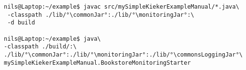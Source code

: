 \begin{lstlisting}
nils@Laptop:~/example$ javac src/mySimpleKiekerExampleManual/*.java\
 -classpath ./lib/°\commonJar°:./lib/°\monitoringJar°:\
 -d build

nils@Laptop:~/example$ java\
-classpath ./build/:\
./lib/°\commonJar°:./lib/°\monitoringJar°:./lib/°\commonsLoggingJar°\
mySimpleKiekerExampleManual.BookstoreMonitoringStarter 
\end{lstlisting}
